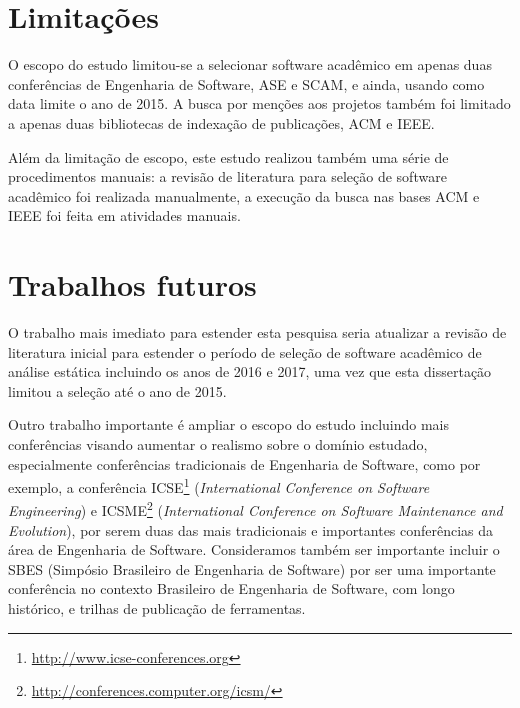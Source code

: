 

\section{Limitações}


O escopo do estudo limitou-se a selecionar software acadêmico em apenas
duas conferências de
Engenharia de Software, ASE e SCAM, e ainda, usando como data limite o ano de
2015. A busca por menções aos projetos também foi limitado a apenas duas
bibliotecas de indexação de publicações, ACM e IEEE.


Além da limitação de escopo, este estudo realizou também uma série de
procedimentos manuais: a revisão de literatura para seleção de software
acadêmico foi realizada manualmente, a execução da busca nas bases ACM e IEEE
foi feita em atividades manuais.


\section{Trabalhos futuros}


O trabalho mais imediato para estender esta pesquisa seria atualizar a revisão
de literatura inicial para estender o período de seleção de software acadêmico
de análise estática incluindo os anos de 2016 e 2017, uma vez que esta
dissertação limitou a seleção até o ano de 2015.

Outro trabalho importante é ampliar o escopo do estudo incluindo mais
conferências visando aumentar o realismo sobre o domínio estudado,
especialmente conferências tradicionais de Engenharia de Software, como por
exemplo, a conferência ICSE\footnote{\url{http://www.icse-conferences.org}}
({\it International Conference on Software Engineering}) e
ICSME\footnote{\url{http://conferences.computer.org/icsm/}} ({\it International
Conference on Software Maintenance and Evolution}), por serem duas das mais
tradicionais e importantes conferências da área de Engenharia de Software.
Consideramos também ser importante incluir o SBES (Simpósio Brasileiro de
Engenharia de Software) por ser uma importante conferência no contexto
Brasileiro de Engenharia de Software, com longo histórico, e trilhas de
publicação de ferramentas.

